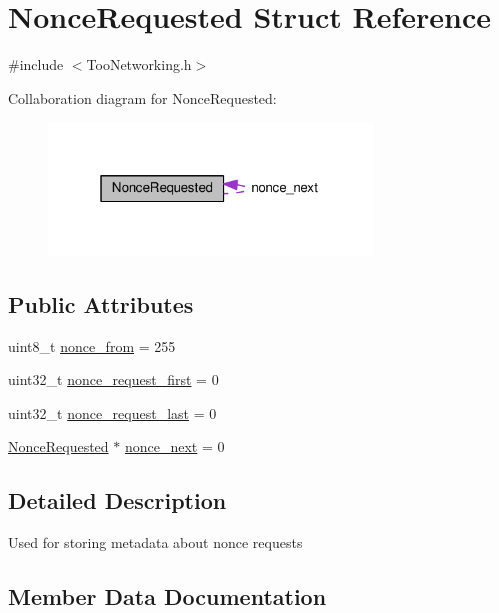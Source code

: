 \hypertarget{structNonceRequested}{}\section{Nonce\+Requested Struct Reference}
\label{structNonceRequested}


{\ttfamily \#include $<$Too\+Networking.\+h$>$}



Collaboration diagram for Nonce\+Requested\+:
\nopagebreak
\begin{figure}[H]
\begin{center}
\leavevmode
\includegraphics[width=244pt]{structNonceRequested__coll__graph}
\end{center}
\end{figure}
\subsection*{Public Attributes}
\begin{DoxyCompactItemize}
\item 
uint8\+\_\+t \hyperlink{structNonceRequested_a49d5f4e83fa72e51cc37237cc46f3a7e}{nonce\+\_\+from} = 255
\item 
uint32\+\_\+t \hyperlink{structNonceRequested_a9e2f47eec20e01c7cce1acf2d47bbf14}{nonce\+\_\+request\+\_\+first} = 0
\item 
uint32\+\_\+t \hyperlink{structNonceRequested_ae5453d115c1ba4044592921e0127f0c8}{nonce\+\_\+request\+\_\+last} = 0
\item 
\hyperlink{structNonceRequested}{Nonce\+Requested} $\ast$ \hyperlink{structNonceRequested_a5e3de3bf702eaea6ab86bc4677c9f4c8}{nonce\+\_\+next} = 0
\end{DoxyCompactItemize}


\subsection{Detailed Description}
Used for storing metadata about nonce requests 

\subsection{Member Data Documentation}
\mbox{\label{structNonceRequested_a49d5f4e83fa72e51cc37237cc46f3a7e}} 
